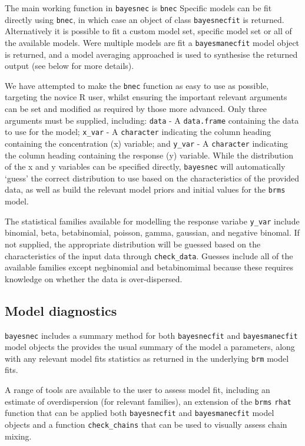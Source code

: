 \documentclass[10pt,a4paper,onecolumn]{article}
\begin{document}
The main working function in \texttt{bayesnec} is \texttt{bnec} Specific
models can be fit directly using \texttt{bnec}, in which case an object
of class \texttt{bayesnecfit} is returned. Alternatively it is possible
to fit a custom model set, specific model set or all of the available
models. Were multiple models are fit a \texttt{bayesmanecfit} model
object is returned, and a model averaging approached is used to
synthesise the returned output (see below for more details).

We have attempted to make the \texttt{bnec} function as easy to use as
possible, targeting the novice R user, whilst ensuring the important
relevant arguments can be set and modified as required by those more
advanced. Only three arguments must be supplied, including:
\texttt{data} - A \texttt{data.frame} containing the data to use for the
model; \texttt{x\_var} - A \texttt{character} indicating the column
heading containing the concentration (x) variable; and \texttt{y\_var} -
A \texttt{character} indicating the column heading containing the
response (y) variable. While the distribution of the x and y variables
can be specified directly, \texttt{bayesnec} will automatically `guess'
the correct distribution to use based on the characteristics of the
provided data, as well as build the relevant model priors and initial
values for the \texttt{brms} model.

The statistical families available for modelling the response variabe
\texttt{y\_var} include binomial, beta, betabinomial, poisson, gamma,
gaussian, and negative binomal. If not supplied, the appropriate
distribution will be guessed based on the characteristics of the input
data through \texttt{check\_data}. Guesses include all of the available
families except negbinomial and betabinomimal because these requires
knowledge on whether the data is over-dispersed.

\hypertarget{model-diagnostics}{%
\subsection{Model diagnostics}\label{model-diagnostics}}

\texttt{bayesnec} includes a summary method for both
\texttt{bayesnecfit} and \texttt{bayesmanecfit} model objects the
provides the usual summary of the model a parameters, along with any
relevant model fits statistics as returned in the underlying
\texttt{brm} model fits.

A range of tools are available to the user to assess model fit,
including an estimate of overdispersion (for relevant families), an
extension of the \texttt{brms} \texttt{rhat} function that can be
applied both \texttt{bayesnecfit} and \texttt{bayesmanecfit} model
objects and a function \texttt{check\_chains} that can be used to
visually assess chain mixing.
\end{document}
